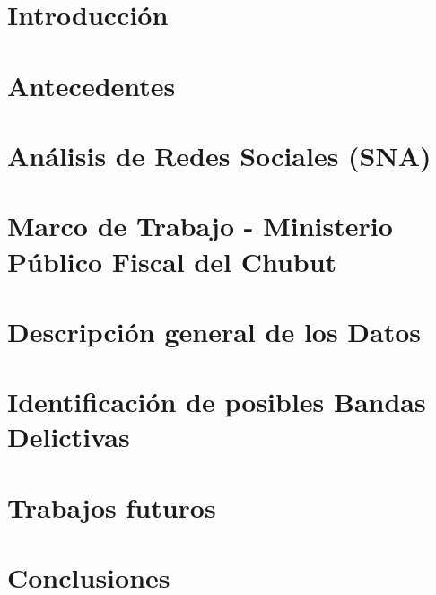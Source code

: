 \documentclass[runningheads]{llncs}
\begin{document}
%

\maketitle              %


%

%
\section{Introducción}


\section{Antecedentes}


\section{Análisis de Redes Sociales (SNA)}


\section{Marco de Trabajo - Ministerio Público Fiscal del Chubut}


\section{Descripción general de los Datos}


\section{Identificación de posibles Bandas Delictivas}


\section{Trabajos futuros}


\section{Conclusiones}

\end{document}
